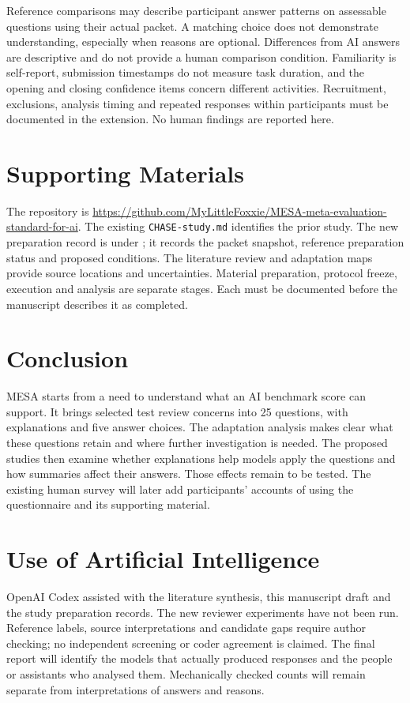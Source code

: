 \documentclass[10pt,conference]{IEEEtran}
\begin{document}
Reference comparisons may describe participant answer patterns on assessable questions using their actual packet. A matching choice does not demonstrate understanding, especially when reasons are optional. Differences from AI answers are descriptive and do not provide a human comparison condition. Familiarity is self-report, submission timestamps do not measure task duration, and the opening and closing confidence items concern different activities. Recruitment, exclusions, analysis timing and repeated responses within participants must be documented in the extension. No human findings are reported here.

\section{Supporting Materials}
The repository is \url{https://github.com/MyLittleFoxxie/MESA-meta-evaluation-standard-for-ai}. The existing \texttt{CHASE-study.md} identifies the prior study. The new preparation record is under ; it records the packet snapshot, reference preparation status and proposed conditions. The literature review and adaptation maps provide source locations and uncertainties. Material preparation, protocol freeze, execution and analysis are separate stages. Each must be documented before the manuscript describes it as completed.

\section{Conclusion}
MESA starts from a need to understand what an AI benchmark score can support. It brings selected test review concerns into 25 questions, with explanations and five answer choices. The adaptation analysis makes clear what these questions retain and where further investigation is needed. The proposed studies then examine whether explanations help models apply the questions and how summaries affect their answers. Those effects remain to be tested. The existing human survey will later add participants' accounts of using the questionnaire and its supporting material.

\section*{Use of Artificial Intelligence}
OpenAI Codex assisted with the literature synthesis, this manuscript draft and the study preparation records. The new reviewer experiments have not been run. Reference labels, source interpretations and candidate gaps require author checking; no independent screening or coder agreement is claimed. The final report will identify the models that actually produced responses and the people or assistants who analysed them. Mechanically checked counts will remain separate from interpretations of answers and reasons.



\end{document}
